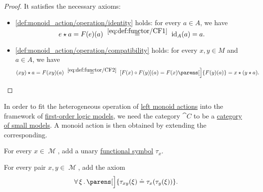 \begin{proof}
  It satisfies the necessary axioms:
  \begin{itemize}
    \item \ref{def:monoid_action/operation/identity} holds: for every \( a \in A \), we have
    \begin{equation*}
      e \star a
      =
      F(e)(a)
      \reloset {\eqref{eq:def:functor/CF1}} =
      \id_A(a)
      =
      a.
    \end{equation*}

    \item \ref{def:monoid_action/operation/compatibility} holds: for every \( x, y \in M \) and \( a \in A \), we have
    \begin{equation*}
      (x y) \star a
      =
      F(x y)(a)
      \reloset {\eqref{eq:def:functor/CF2}} =
      [F(x) \bincirc F(y)](a)
      =
      F(x)\parens[\Big]{ F(y)(a) }
      =
      x \star (y \star a).
    \end{equation*}
  \end{itemize}
\end{proof}

\begin{remark}\label{rem:theory_of_monoid_actions}
  In order to fit the heterogeneous operation of \hyperref[def:monoid_action]{left monoid actions} into the framework of \hyperref[def:first_order_semantics/satisfiability]{first-order logic models}, we need the category \( \cat{C} \) to be a \hyperref[def:category_of_small_first_order_models]{category of small models}. A monoid action is then obtained by extending the corresponding.

  \begin{thmenum}
     For every \( x \in \mscrM \), add a unary \hyperref[def:first_order_language/func]{functional symbol} \( \tau_x \).

     For every pair \( x, y \in \mscrM \), add the axiom
    \begin{equation}\label{eq:rem:theory_of_monoid_actions/axiom_schema}
      \qforall \xi \parens[\Big]{ \tau_{xy}(\xi) \doteq \tau_x(\tau_y(\xi)) }.
    \end{equation}
  \end{thmenum}
\end{remark}


